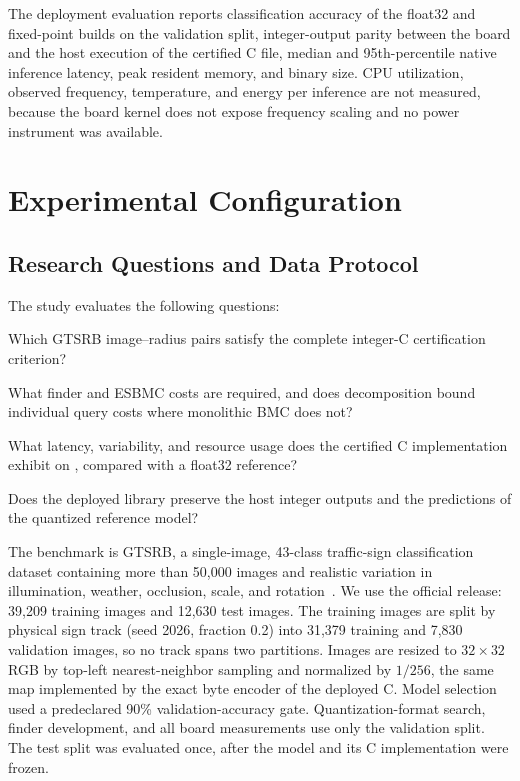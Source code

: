 The deployment evaluation reports classification accuracy of the float32 and fixed-point builds on the validation split, integer-output parity between the board and the host execution of the certified C file, median and 95th-percentile native inference latency, peak resident memory, and binary size. CPU utilization, observed frequency, temperature, and energy per inference are not measured, because the board kernel does not expose frequency scaling and no power instrument was available.


\section{Experimental Configuration}
\label{sec:setup}

\subsection{Research Questions and Data Protocol}

The study evaluates the following questions:

\begin{tcolorbox}[
    colback=gray!10,
    colframe=gray!50,
    boxrule=0.5pt,
    arc=1mm,
    left=2mm,
    right=2mm,
    top=1mm,
    bottom=1mm
]
\begin{description}[leftmargin=0.55cm,labelsep=0.2em,itemsep=1pt,topsep=0pt]
  \item[RQ1:] Which GTSRB image--radius pairs satisfy the complete integer-C certification criterion?
  \item[RQ2:] What finder and ESBMC costs are required, and does decomposition bound individual query costs where monolithic BMC does not?
  \item[RQ3:] What latency, variability, and resource usage does the certified C implementation exhibit on \AAOS{}, compared with a float32 reference?
  \item[RQ4:] Does the deployed library preserve the host integer outputs and the predictions of the quantized reference model?
\end{description}
\end{tcolorbox}

The benchmark is GTSRB, a single-image, 43-class traffic-sign classification dataset containing more than 50,000 images and realistic variation in illumination, weather, occlusion, scale, and rotation~\cite{Stallkamp2011GTSRB}. We use the official release: 39,209 training images and 12,630 test images. The training images are split by physical sign track (seed 2026, fraction 0.2) into 31,379 training and 7,830 validation images, so no track spans two partitions. Images are resized to $32\times32$ RGB by top-left nearest-neighbor sampling and normalized by $1/256$, the same map implemented by the exact byte encoder of the deployed C. Model selection used a predeclared 90\% validation-accuracy gate. Quantization-format search, finder development, and all board measurements use only the validation split. The test split was evaluated once, after the model and its C implementation were frozen.


